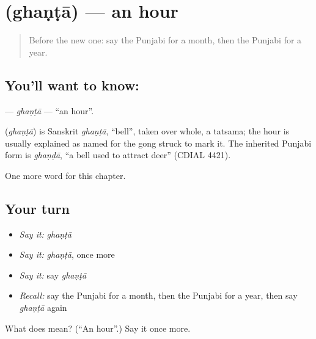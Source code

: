 \section[\texorpdfstring{\pa{ਘੰਟਾ} (ghaṇṭā)}{ਘੰਟਾ (ghaṇṭā)}]{ (ghaṇṭā) — an hour}

\label{lesson:PA-C86-ghanta}



\begin{quote}
Before the new one: say the Punjabi for a month, then the Punjabi for a year.
\end{quote}

\subsection*{You'll want to know: }
\textbf{} — \emph{ghaṇṭā} — \textquotedblleft{}an hour\textquotedblright{}.

\begin{cousinweb}
\textbf{} (\emph{ghaṇṭā}) is Sanskrit \emph{ghaṇṭā}, \textquotedblleft{}bell\textquotedblright{}, taken over whole, a tatsama; the hour is usually explained as named for the gong struck to mark it. The inherited Punjabi form is \emph{ghaṇḍā}, \textquotedblleft{}a bell used to attract deer\textquotedblright{} (CDIAL 4421).
\end{cousinweb}

\begin{grammarlens}[title={What you've built}]
One more word for this chapter.
\end{grammarlens}

\subsection*{Your turn}
\begin{itemize}
\raggedright
  \item \emph{Say it:} \emph{ghaṇṭā}
  \item \emph{Say it:} \emph{ghaṇṭā}, once more
  \item \emph{Say it:} say \emph{ghaṇṭā}
  \item \emph{Recall:} say the Punjabi for a month, then the Punjabi for a year, then say \emph{ghaṇṭā} again
\end{itemize}

\begin{tcolorbox}[breakable,colback=teal!4,colframe=teal!35!black,title={Before you move on}]
What does  mean? (\textquotedblleft{}An hour\textquotedblright{}.) Say it once more.
\end{tcolorbox}
